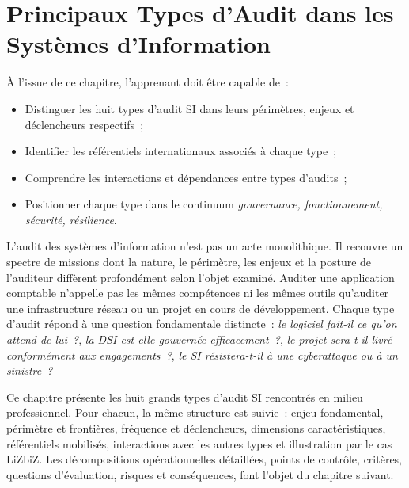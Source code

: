 
\chapter{Principaux Types d'Audit dans les Systèmes d'Information}%
\label{chap:05_types_audits}

\begin{boxobjectifs}
À l'issue de ce chapitre, l'apprenant doit être capable de~:
\begin{itemize}
    \item Distinguer les huit types d'audit SI dans leurs périmètres, enjeux
        et déclencheurs respectifs~;
    \item Identifier les référentiels internationaux associés à chaque type~;
    \item Comprendre les interactions et dépendances entre types d'audits~;
    \item Positionner chaque type dans le continuum
        \textit{gouvernance, fonctionnement, sécurité, résilience}.
\end{itemize}
\end{boxobjectifs}

L'audit des systèmes d'information n'est pas un acte monolithique. Il recouvre un
spectre de missions dont la nature, le périmètre, les enjeux et la posture de
l'auditeur diffèrent profondément selon l'objet examiné. Auditer une application
comptable n'appelle pas les mêmes compétences ni les mêmes outils qu'auditer une
infrastructure réseau ou un projet en cours de développement. Chaque type d'audit
répond à une question fondamentale distincte~: \textit{le logiciel fait-il ce qu'on
attend de lui~?}, \textit{la DSI est-elle gouvernée efficacement~?}, \textit{le projet
sera-t-il livré conformément aux engagements~?}, \textit{le SI résistera-t-il à une
cyberattaque ou à un sinistre~?}

Ce chapitre présente les huit grands types d'audit SI rencontrés en milieu
professionnel. Pour chacun, la même structure est suivie~: enjeu fondamental,
périmètre et frontières, fréquence et déclencheurs, dimensions caractéristiques,
référentiels mobilisés, interactions avec les autres types et illustration par le
cas LiZbiZ. Les décompositions opérationnelles détaillées, points de contrôle,
critères, questions d'évaluation, risques et conséquences, font l'objet du chapitre
suivant.


